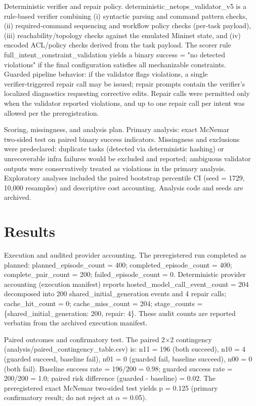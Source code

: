 \documentclass[conference]{IEEEtran}
\begin{document}
Deterministic verifier and repair policy. deterministic\_netops\_validator\_v5 is a rule‑based verifier combining (i) syntactic parsing and command pattern checks, (ii) required‑command sequencing and workflow policy checks (per‑task payload), (iii) reachability/topology checks against the emulated Mininet state, and (iv) encoded ACL/policy checks derived from the task payload. The scorer rule full\_intent\_constraint\_validation yields a binary success = "no detected violations" if the final configuration satisfies all mechanizable constraints. Guarded pipeline behavior: if the validator flags violations, a single verifier‑triggered repair call may be issued; repair prompts contain the verifier's localized diagnostics requesting corrective edits. Repair calls were permitted only when the validator reported violations, and up to one repair call per intent was allowed per the preregistration.

Scoring, missingness, and analysis plan. Primary analysis: exact McNemar two‑sided test on paired binary success indicators. Missingness and exclusions were predeclared: duplicate tasks (detected via deterministic hashing) or unrecoverable infra failures would be excluded and reported; ambiguous validator outputs were conservatively treated as violations in the primary analysis. Exploratory analyses included the paired bootstrap percentile CI (seed = 1729, 10,000 resamples) and descriptive cost accounting. Analysis code and seeds are archived.

\section{Results}
Execution and audited provider accounting. The preregistered run completed as planned: planned\_episode\_count = 400; completed\_episode\_count = 400; complete\_pair\_count = 200; failed\_episode\_count = 0. Deterministic provider accounting (execution manifest) reports hosted\_model\_call\_event\_count = 204 decomposed into 200 shared\_initial\_generation events and 4 repair calls; cache\_hit\_count = 0; cache\_miss\_count = 204; stage\_counts = \{shared\_initial\_generation: 200, repair: 4\}. These audit counts are reported verbatim from the archived execution manifest.

Paired outcomes and confirmatory test. The paired 2\ensuremath{\times}2 contingency (analysis/paired\_contingency\_table.csv) is: n11 = 196 (both succeed), n10 = 4 (guarded succeed, baseline fail), n01 = 0 (guarded fail, baseline succeed), n00 = 0 (both fail). Baseline success rate = 196/200 = 0.98; guarded success rate = 200/200 = 1.0; paired risk difference (guarded - baseline) = 0.02. The preregistered exact McNemar two‑sided test yields p = 0.125 (primary confirmatory result; do not reject at \ensuremath{\alpha} = 0.05).
\end{document}
